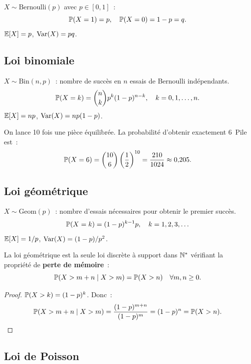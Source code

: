 \begin{definition}[Bernoulli]
$X \sim \text{Bernoulli}(p)$ avec $p \in [0,1]$~:
\[
    \mathbb{P}(X = 1) = p, \quad \mathbb{P}(X = 0) = 1 - p = q.
\]
$\mathbb{E}[X] = p$, $\mathrm{Var}(X) = pq$.
\end{definition}

\subsection{Loi binomiale}

\begin{definition}[Binomiale]
$X \sim \text{Bin}(n, p)$~: nombre de succ\`es en $n$ essais de Bernoulli
ind\'ependants.
\[
    \mathbb{P}(X = k) = \binom{n}{k} p^k (1-p)^{n-k}, \quad k = 0, 1, \ldots, n.
\]
$\mathbb{E}[X] = np$, $\mathrm{Var}(X) = np(1-p)$.
\end{definition}

\begin{exemple}
On lance 10 fois une pi\`ece \'equilibr\'ee. La probabilit\'e d'obtenir exactement
6~Pile est~:
\[
    \mathbb{P}(X = 6) = \binom{10}{6} \left(\frac{1}{2}\right)^{10}
    = \frac{210}{1024} \approx 0{,}205.
\]
\end{exemple}

\subsection{Loi g\'eom\'etrique}

\begin{definition}
$X \sim \text{Geom}(p)$~: nombre d'essais n\'ecessaires pour obtenir le premier
succ\`es.
\[
    \mathbb{P}(X = k) = (1-p)^{k-1} p, \quad k = 1, 2, 3, \ldots
\]
$\mathbb{E}[X] = 1/p$, $\mathrm{Var}(X) = (1-p)/p^2$.
\end{definition}

\begin{proposition}
La loi g\'eom\'etrique est la seule loi discr\`ete \`a support dans $\mathbb{N}^*$
v\'erifiant la propri\'et\'e de \textbf{perte de m\'emoire}~:
\[
    \mathbb{P}(X > m + n \mid X > m) = \mathbb{P}(X > n) \quad \forall m, n \geq 0.
\]
\end{proposition}

\begin{proof}
$\mathbb{P}(X > k) = (1-p)^k$. Donc~:
\[
    \mathbb{P}(X > m+n \mid X > m) = \frac{(1-p)^{m+n}}{(1-p)^m} = (1-p)^n = \mathbb{P}(X > n). \qedhere
\]
\end{proof}

\subsection{Loi de Poisson}

